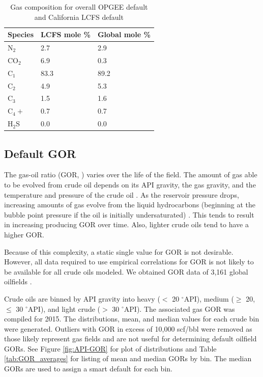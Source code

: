 \documentclass[11pt]{report}
\newcommand{\xlname}[1]{\raisebox{1pt}{\fcolorbox{light-gray}{light-gray}{\texttt{\textcolor{stanford}{\scriptsize{#1}}}}}}
\begin{document}
\begin{table}
\begin{scriptsize}
\caption{Gas composition for overall OPGEE default and California LCFS default}
\label{tab:gas_composition}
\begin{tabular*}{0.5\columnwidth}{p{}p{}p{}}
\toprule
Species & LCFS mole \% & Global mole \%  \\
\midrule
N$_2$	&2.7		& 2.9 \\
CO$_2$	&6.9		& 0.3 \\
C$_1$	&83.3	& 89.2 \\
C$_2$	&4.9		& 5.3 \\
C$_3$	&1.5		& 1.6 \\
C$_4+$	&0.7		& 0.7 \\
H$_2$S	&0.0		& 0.0 \\
\bottomrule
\end{tabular*}
\end{scriptsize}
\end{table}

\subsection{Default GOR} \label{sec:GOR_default}

The gas-oil ratio (GOR, \xlname{GOR}) varies over the life of the field. The amount of gas able to be evolved from crude oil depends on its API gravity, the gas gravity, and the temperature and pressure of the crude oil \cite[p. 297]{Mccain1990}. As the reservoir pressure drops, increasing amounts of gas evolve from the liquid hydrocarbons (beginning at the bubble point pressure if the oil is initially undersaturated) \cite{Mccain1990}. This tends to result in increasing producing GOR over time. Also, lighter crude oils tend to have a higher GOR. 

Because of this complexity, a static single value for GOR is not desirable. However, all data required to use empirical correlations for GOR is not likely to be available for all crude oils modeled. We obtained GOR data of 3,161 global oilfields \cite{Masnadi2018}. 

Crude oils are binned by API gravity into heavy ($<$ 20 $^\circ$API), medium ($\geq$ 20, $\leq$ 30 $^\circ$API), and light crude ($>$ 30 $^\circ$API). The associated gas GOR was compiled for 2015. The distributions, mean, and median values for each crude bin were generated. Outliers with GOR in excess of 10,000 scf/bbl were removed as those likely represent gas fields and are not useful for determining default oilfield GORs. See Figure \ref{fig:API-GOR} for plot of distributions and Table \ref{tab:GOR_averages} for listing of mean and median GORs by bin. The median GORs are used to assign a smart default for each bin.
\end{document}
